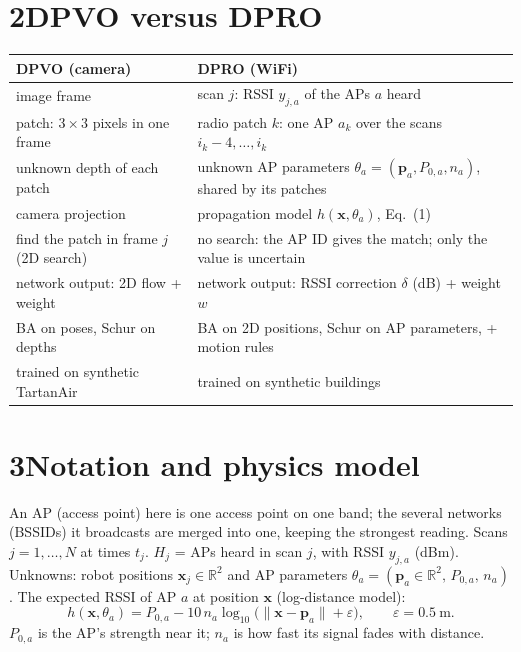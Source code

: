 \documentclass[11pt]{article}
\newcommand{\x}{\mathbf{x}}
\newcommand{\p}{\mathbf{p}}
\begin{document}
\section*{2\quad DPVO versus DPRO}
\begin{center}\small
\begin{tabular}{@{}ll@{}}
\toprule
DPVO (camera) & DPRO (WiFi) \\
\midrule
image frame & scan $j$: RSSI $y_{j,a}$ of the APs $a$ heard \\
patch: $3\times3$ pixels in one frame & radio patch $k$: one AP $a_k$ over the scans $i_k-4,\dots,i_k$ \\
unknown depth of each patch & unknown AP parameters $\theta_a=(\p_a, P_{0,a}, n_a)$, shared by its patches \\
camera projection & propagation model $h(\x,\theta_a)$, Eq.~(1) \\
find the patch in frame $j$ (2D search) & no search: the AP ID gives the match; only the value is uncertain \\
network output: 2D flow + weight & network output: RSSI correction $\delta$ (dB) + weight $w$ \\
BA on poses, Schur on depths & BA on 2D positions, Schur on AP parameters, + motion rules \\
trained on synthetic TartanAir & trained on synthetic buildings \\
\bottomrule
\end{tabular}
\end{center}

\section*{3\quad Notation and physics model}
An AP (access point) here is one access point on one band; the several networks (BSSIDs) it broadcasts are merged into one, keeping the strongest reading. Scans $j=1,\dots,N$ at times $t_j$. $H_j$ = APs heard in scan $j$, with RSSI $y_{j,a}$ (dBm).
Unknowns: robot positions $\x_j\in\mathbb{R}^2$ and AP parameters $\theta_a=(\p_a\in\mathbb{R}^2,\,P_{0,a},\,n_a)$.
The expected RSSI of AP $a$ at position $\x$ (log-distance model):
\begin{equation}
h(\x,\theta_a)=P_{0,a}-10\,n_a\log_{10}\!\big(\lVert \x-\p_a\rVert+\varepsilon\big),\qquad \varepsilon=0.5\ \text{m}.
\end{equation}
$P_{0,a}$ is the AP's strength near it; $n_a$ is how fast its signal fades with distance.
\end{document}
